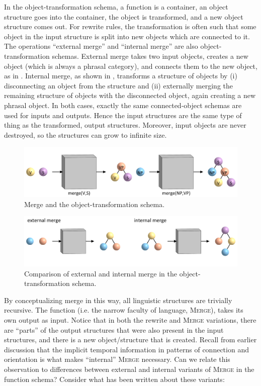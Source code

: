   In the object-transformation schema, a function is a container, an object structure goes into the container, the object is transformed, and a new object structure comes out. For rewrite rules, the transformation is often such that some object in the input structure is split into new objects which are connected to it. The operations “external merge” and “internal merge” are also object-transformation schemas. External merge takes two input objects, creates a new object (which is always a phrasal category), and connects them to the new object, as in {}. Internal merge, as shown in {}, transforms a structure of objects by (i) disconnecting an object from the structure and (ii) externally merging the remaining structure of objects with the disconnected object, again creating a new phrasal object. In both cases, exactly the same connected-object schemas are used for inputs and outputs. Hence the input structures are the same type of thing as the transformed, output structures. Moreover, input objects are never destroyed, so the structures can grow to infinite size.

  
\begin{figure}
\includegraphics[width=\textwidth]{figures/Tilsen-img108.png}
\caption{Merge and the object-transformation schema.}
\label{fig:5:4}
\end{figure}
 
\begin{figure}
\includegraphics[width=\textwidth]{figures/Tilsen-img109.png}
\caption{Comparison of external and internal merge in the object-transformation schema.}
\label{fig:5:5}
\end{figure}

  By conceptualizing merge in this way, all linguistic structures are trivially recursive. The function (i.e. the narrow faculty of language, \textsc{Merge}), takes its own output as input. Notice that in both the rewrite and \textsc{Merge} variations, there are “parts” of the output structures that were also present in the input structures, and there is a new object/structure that is created. Recall from earlier discussion that the implicit temporal information in patterns of connection and orientation is what makes “internal” \textsc{Merge} necessary. Can we relate this observation to differences between external and internal variants of \textsc{Merge} in the function schema? Consider what has been written about these variants:

